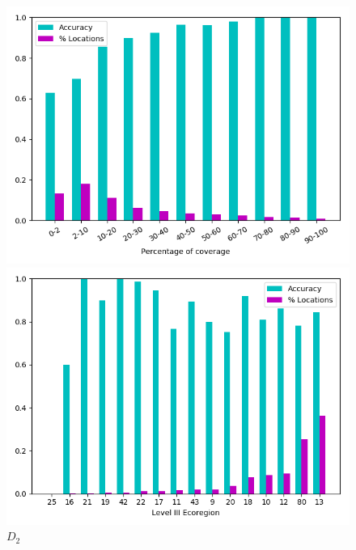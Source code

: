 \documentclass{article} %
\begin{document}
\begin{figure}
\centering
\begin{minipage}{.24\textwidth}
  \centering
\includegraphics[width=\textwidth]{pics/d4_accuracy_vs_coverage.png}
\caption{$D_1$}
\end{minipage}
\begin{minipage}{.01\textwidth}
\end{minipage}
\begin{minipage}{.24\textwidth}
  \centering
\includegraphics[width=\textwidth]{pics/d4_accuracy_vs_ecoregion.png}
\caption{$D_2$}
\end{minipage}
\begin{minipage}{.24\textwidth}

\end{minipage}
\end{figure}
\end{document}
